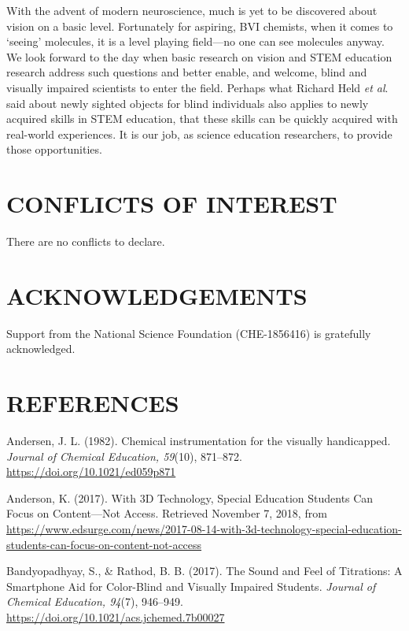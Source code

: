 \documentclass[11.5pt]{sig-alternate} %
\begin{document}
\begin{large}
With the advent of modern neuroscience, much is yet to be discovered about vision on a basic level. Fortunately for aspiring, BVI chemists, when it comes to ‘seeing’ molecules, it is a level playing field—no one can see molecules anyway. We look forward to the day when basic research on vision and STEM education research address such questions and better enable, and welcome, blind and visually impaired scientists to enter the field. Perhaps what Richard Held \textit{et al}. said about newly sighted objects for blind individuals also applies to newly acquired skills in STEM education, that these skills can be quickly acquired with real-world experiences. It is our job, as science education researchers, to provide those opportunities. 

\section*{CONFLICTS OF INTEREST}

There are no conflicts to declare.

\section*{ACKNOWLEDGEMENTS}

Support from the National Science Foundation (CHE-1856416) is gratefully acknowledged.

\end{large}
\clearpage
\section*{REFERENCES}\par 

\leftskip 0.25in
\parindent -0.25in 
Andersen, J. L. (1982). Chemical instrumentation for the visually handicapped. \textit{Journal of Chemical Education, 59}(10), 871–872. \url{https://doi.org/10.1021/ed059p871}

Anderson, K. (2017). With 3D Technology, Special Education Students Can Focus on Content—Not Access. Retrieved November 7, 2018, from \url{https://www.edsurge.com/news/2017-08-14-with-3d-technology-special-education-students-can-focus-on-content-not-access}

Bandyopadhyay, S., \& Rathod, B. B. (2017). The Sound and Feel of Titrations: A Smartphone Aid for Color-Blind and Visually Impaired Students. \textit{Journal of Chemical Education, 94}(7), 946–949. \url{https://doi.org/10.1021/acs.jchemed.7b00027}
\end{document}
